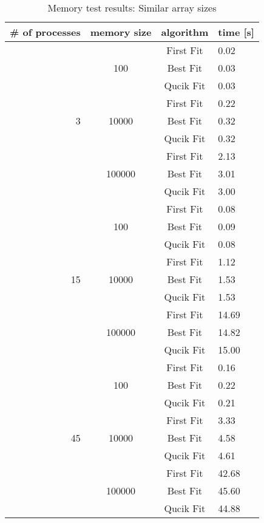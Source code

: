 \documentclass[11pt]{article}
\begin{document}
\begin{table}[H]
	\begin{center}
		\begin{tabular}{ r | c | c | l }
		{ \bf \# of processes} & { \bf memory size } & { \bf algorithm } & { \bf time [s] }\\
		\hline
		   & 				& First Fit	& {\color{MidnightBlue}0.02}\\
		   & 100		& Best Fit	& 0.03\\
		   & 				& Qucik Fit	& 0.03\\ \cline{2-4}
		   & 				& First Fit	& {\color{MidnightBlue}0.22}\\
		3  & 10000	& Best Fit	& 0.32\\
		   & 				& Qucik Fit	& 0.32\\ \cline{2-4}
		   & 				& First Fit	& {\color{MidnightBlue}2.13}\\
		   & 100000	& Best Fit	& {\color{BrickRed}3.01}\\
		   & 				& Qucik Fit	& 3.00\\ \cline{2-4}
    \hline
		   & 				& First Fit	& 0.08\\
		   & 100		& Best Fit	& {\color{BrickRed}0.09}\\
		   & 				& Qucik Fit	& 0.08\\ \cline{2-4}
		   & 				& First Fit	& {\color{MidnightBlue}1.12}\\
		15 & 10000	& Best Fit	& 1.53\\
		   & 				& Qucik Fit	& 1.53\\ \cline{2-4}
		   & 				& First Fit	& {\color{MidnightBlue}14.69}\\
		   & 100000	& Best Fit	& 14.82\\
		   & 				& Qucik Fit	& {\color{BrickRed}15.00}\\ \cline{2-4}
    \hline
		   & 				& First Fit	& {\color{MidnightBlue}0.16}\\
		   & 100		& Best Fit	& {\color{BrickRed}0.22}\\
		   & 				& Qucik Fit	& 0.21\\ \cline{2-4}
		   & 				& First Fit	& {\color{MidnightBlue}3.33}\\
		45 & 10000	& Best Fit	& 4.58\\
		   & 				& Qucik Fit	& {\color{BrickRed}4.61}\\ \cline{2-4}
		   & 				& First Fit	& {\color{MidnightBlue}42.68}\\
		   & 100000	& Best Fit	& {\color{BrickRed}45.60}\\
		   & 				& Qucik Fit	& 44.88\\
    \hline
		\end{tabular}
	  
	  \caption{Memory test results: Similar array sizes}
	  \label{tab:memory_results_similar}
	\end{center}
\end{table}
\end{document}
